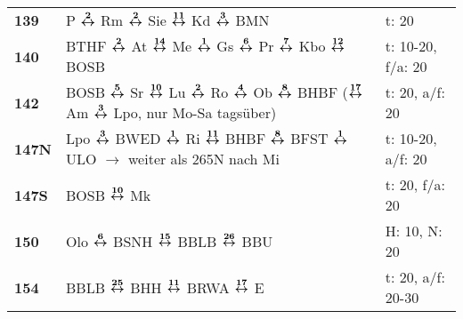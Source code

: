 \begin{minipage}[t]{0.45\textwidth}
\begin{tabular}{>{\bfseries}L{1.2cm}L{9.0cm}L{3.0cm}}
\bus{} 139    & P $\xarwe{2}$ Rm $\xarwe{2}$ Sie $\xarwe{11}$ Kd $\xarwe{3}$ BMN                                                                                                    & t: 20                      \\
\bus{} 140    & BTHF $\xarwe{2}$ At $\xarwe{14}$ Me $\xarwe{1}$ Gs $\xarwe{6}$ Pr $\xarwe{7}$ Kbo $\xarwe{12}$ BOSB                                                                 & t: 10-20, f/a: 20          \\
\bus{} 142    & BOSB $\xarwe{5}$ Sr $\xarwe{10}$ Lu $\xarwe{2}$ Ro $\xarwe{4}$ Ob $\xarwe{8}$ BHBF ($\xarwe{17}$ Am $\xarwe{3}$ Lpo, nur Mo-Sa tagsüber)                            & t: 20, a/f: 20             \\
\bus{} 147N   & Lpo $\xarwe{3}$ BWED $\xarwe{1}$ Ri $\xarwe{11}$ BHBF $\xarwe{8}$ BFST $\xarwe{1}$ ULO $\rightarrow$ weiter als 265N nach Mi & t: 10-20, a/f: 20 \\
\bus{} 147S   & BOSB $\xarwe{10}$ Mk & t: 20, f/a: 20 \\
\bus{} 150    & Olo $\xarwe{6}$ BSNH $\xarwe{15}$ BBLB $\xarwe{26}$ BBU                                                                                                             & H: 10, N: 20               \\
\bus{} 154    & BBLB $\xarwe{25}$ BHH $\xarwe{11}$ BRWA $\xarwe{17}$ E
& t: 20, a/f: 20-30          \\
\hline
\end{tabular}
\end{minipage}
